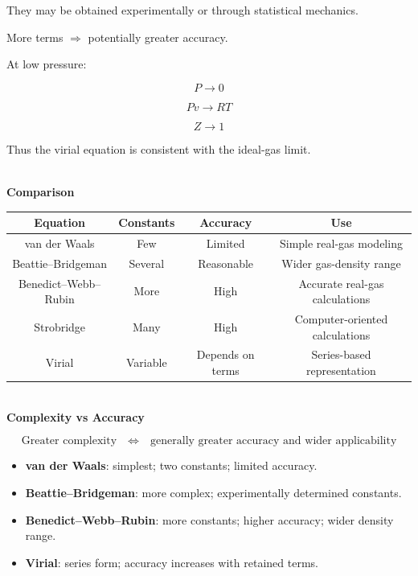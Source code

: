 \documentclass[12pt]{article}
\begin{document}
They may be obtained experimentally or through statistical mechanics.

More terms $\Rightarrow$ potentially greater accuracy.

At low pressure:

\[
\boxed{P\rightarrow0}
\]

\[
\boxed{Pv\rightarrow RT}
\]

\[
\boxed{Z\rightarrow1}
\]

Thus the virial equation is consistent with the ideal-gas limit.

\textbf{\\ Comparison}

\begin{center}
\begin{tabular}{|c|c|c|c|}
\hline
\textbf{Equation} & \textbf{Constants} & \textbf{Accuracy} & \textbf{Use} \\
\hline
van der Waals & Few & Limited & Simple real-gas modeling \\
\hline
Beattie--Bridgeman & Several & Reasonable & Wider gas-density range \\
\hline
Benedict--Webb--Rubin & More & High & Accurate real-gas calculations \\
\hline
Strobridge & Many & High & Computer-oriented calculations \\
\hline
Virial & Variable & Depends on terms & Series-based representation \\
\hline
\end{tabular}
\end{center}

\textbf{\\ Complexity vs Accuracy}

\[
\boxed{
\text{Greater complexity}
\quad\Longleftrightarrow\quad
\text{generally greater accuracy and wider applicability}
}
\]

\begin{itemize}[leftmargin=*]
    \item \textbf{van der Waals}: simplest; two constants; limited accuracy.
    \item \textbf{Beattie--Bridgeman}: more complex; experimentally determined constants.
    \item \textbf{Benedict--Webb--Rubin}: more constants; higher accuracy; wider density range.
    \item \textbf{Virial}: series form; accuracy increases with retained terms.
\end{itemize}
\end{document}
